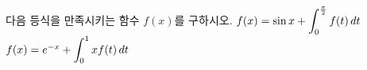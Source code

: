 다음 등식을 만족시키는 함수 $f(x)$를 구하시오.
 $f(x)=\sin x+\displaystyle\int_{0}^{\frac{\pi}{2}}f(t)\mkern3mu dt$
 $f(x)=e^{-x}+\displaystyle\int_{0}^{1}xf(t)\mkern3mu dt$
